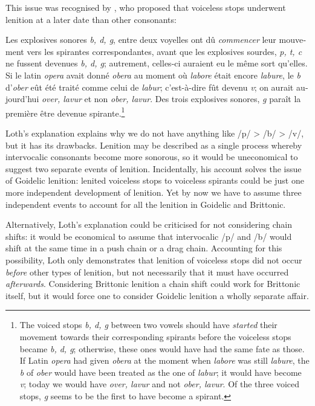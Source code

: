 \message{ !name(../main.tex)}\documentclass[
a4paper,
12pt,
twoside,
openright
]{memoir}
\makeatletter
\newcommand{\onesp}[1]{\begin{spacing}{1}#1\end{spacing}}
\newcommand*{\ie}{\@ifnextchar{.}{i.e}{i.e.\@\xspace}}
\newcommand{\tqt}[3]{%
  \begin{displayquote}%
    {\small\onesp{#1~\autocite[#3]{#2}}}%
    \end{displayquote}%
  }%
\makeatother
\begin{document}
This issue was recognised  by \textcite{loth_les_1892}, who proposed that voiceless stops underwent lenition at a later date than other consonants:
\tqt{\textfrench{Les explosives sonores \textit{b, d, g}, entre deux voyelles ont dû \textit{commencer} leur mouvement vers les spirantes correspondantes, avant que les explosives sourdes, \textit{p, t, c} ne fussent devenues \textit{b, d, g}; autrement, celles-ci auraient eu le même sort qu'elles. Si le latin \textit{opera} avait donné \textit{obera} au moment où \textit{labore} était encore \textit{labure}, le \textit{b} d'\textit{ober} eût été traité comme celui de \textit{labur}; c'est-à-dire fût devenu \textit{v}; on aurait aujourd'hui \textit{over, lavur} et non \textit{ober, lavur}. Des trois explosives sonores, \textit{g} paraît la première être devenue spirante.}\footnote{The voiced stops \textit{b, d, g} between two vowels should have \emph{started} their movement towards their corresponding spirants before the voiceless stops became \textit{b, d, g}; otherwise, these ones would have had the same fate as those. If Latin \textit{opera} had given \textit{obera} at the moment when \textit{labore} was still \textit{labure}, the \textit{b} of \textit{ober} would have been treated as the one of \textit{labur}; \ie it would have become \textit{v}; today we would have \textit{over, lavur} and not \textit{ober, lavur}. Of the three voiced stops, \textit{g} seems to be the first to have become a spirant.}}{loth_les_1892}{87}
Loth's explanation explains why we do not have anything like /p/ > /b/ > /v/, but it has its drawbacks. Lenition may be described as a single process whereby intervocalic consonants become more sonorous, so it would be uneconomical to suggest two separate events of lenition. Incidentally, his account solves the issue of Goidelic lenition:  lenited voiceless stops to voiceless spirants could be just one more independent development of lenition. Yet by now we have to assume three independent events to account for all the lenition in Goidelic and Brittonic.

Alternatively, Loth's explanation could be criticised for not considering chain shifts: it would be economical to assume that intervocalic /p/ and /b/ would shift at the same time in a push chain or a drag chain. Accounting for this possibility, Loth only demonstrates  that lenition of voiceless stops did not  occur \emph{before} other types of lenition, but not necessarily that it must have occurred \emph{afterwards}. Considering Brittonic lenition a chain shift could work for Brittonic itself, but it would force one to consider Goidelic lenition a wholly separate affair.
\end{document}
